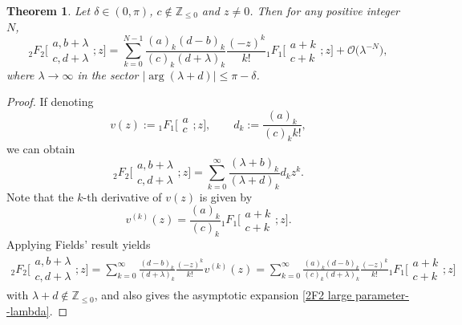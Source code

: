 \documentclass[10pt,a4paper]{amsart}
\numberwithin{equation}{section}
\newtheorem{Theorem}{Theorem}[section]
\newcommand{\ZZ}{\ensuremath{\mathbb{Z}}}
\newcommand{\mo}{\mathcal{O}}
\begin{document}
\begin{Theorem}\label{Thm: 2F2 large parameter--lambda}
	Let $\delta\in (0,\pi)$, $c\notin\ZZ_{\leqslant 0}$ and $z\ne 0$. Then for any positive integer $N$,
	\begin{equation}\label{2F2 large parameter--lambda}
		{}_2F_2\biggl[\begin{matrix}
			a,b+\lambda\\
			c,d+\lambda
		\end{matrix};z\biggr]=\sum_{k=0}^{N-1}\frac{(a)_k (d-b )_k}{(c)_k (d+\lambda )_k}\frac{ (-z )^k}{k!}{}_1F_1\biggl[\begin{matrix}
			a+k\\
			c+k
		\end{matrix};z\biggr]+\mo \bigl(\lambda^{-N} \bigr),
	\end{equation}
	where $\lambda\to\infty$ in the sector $|{\arg}(\lambda+d)|\leqslant \pi-\delta$.
\end{Theorem}

\begin{proof}
	If denoting
	\[v(z):={}_1F_1\biggl[\begin{matrix}
		a\\
		c
	\end{matrix};z\biggr],\qquad d_k:=\frac{(a)_k}{(c)_k k!},\]
	we can obtain
	\[{}_2F_2\biggl[\begin{matrix}
		a,b+\lambda\\
		c,d+\lambda
	\end{matrix};z\biggr]=\sum_{k=0}^{\infty}\frac{ (\lambda+b )_k}{ (\lambda+d )_k}d_k z^k.\]
	Note that the $k$-th derivative of $v(z)$ is given by \cite[p.~405, equation~(16.3.1)]{NIST-Handbook}
	\[v^{(k)}(z)=\frac{(a)_k}{(c)_k}
	{}_1F_1\biggl[\begin{matrix}
		a+k\\
		c+k
	\end{matrix};z\biggr].\]
	Applying Fields' result \cite[Theorem 3]{Fields-1967} yields
	\begin{gather}\label{2F2 transformation}
		{}_2F_2\biggl[\begin{matrix}
			a,b+\lambda\\
			c,d+\lambda
		\end{matrix};z\biggr]=\sum_{k=0}^{\infty}\frac{(d-b)_k}{(d+\lambda)_k}\frac{(-z)^k}{k!}v^{(k)}(z)=\sum_{k=0}^{\infty}\frac{(a)_k(d-b)_k}{(c)_k(d+\lambda)_k}\frac{(-z)^k}{k!}{}_1F_1\biggl[\begin{matrix}
			a+k\\
			c+k
		\end{matrix};z\biggr]
	\end{gather}
	with $\lambda+d\notin\ZZ_{\leqslant 0}$, and also gives the asymptotic expansion \eqref{2F2 large parameter--lambda}.
\end{proof}
\end{document}
